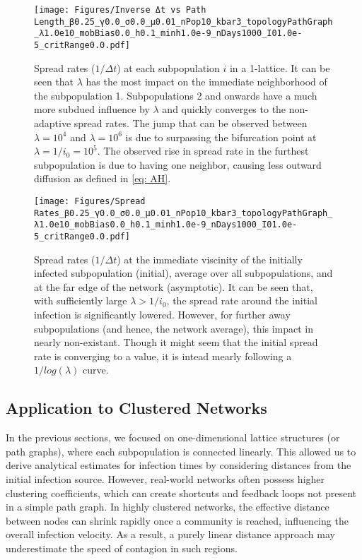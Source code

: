 \begin{figure}
    \centering
    \texttt{[image: Figures/Inverse Δt vs Path Length\_β0.25\_γ0.0\_σ0.0\_μ0.01\_nPop10\_kbar3\_topologyPathGraph\_λ1.0e10\_mobBias0.0\_h0.1\_minh1.0e-9\_nDays1000\_I01.0e-5\_critRange0.0.pdf]}
    \caption{\small Spread rates ($1/\Delta t$) at each subpopulation $i$ in a 1-lattice. It can be seen that $\lambda$ has the most impact on the immediate neighborhood of the subpopulation 1. Subpopulations 2 and onwards have a much more subdued influence by $\lambda$ and quickly converges to the non-adaptive spread rates. The jump that can be observed between $\lambda=10^4$ and $\lambda=10^6$ is due to surpassing the bifurcation point at $\lambda=1/i_0=10^5$. The observed rise in spread rate in the furthest subpopulation is due to having one neighbor, causing less outward diffusion as defined in \ref{eq: AH}.}
    \label{fig: inverse Δt vs path length var lambda}
\end{figure}

\begin{figure}
    \centering
    \texttt{[image: Figures/Spread Rates\_β0.25\_γ0.0\_σ0.0\_μ0.01\_nPop10\_kbar3\_topologyPathGraph\_λ1.0e10\_mobBias0.0\_h0.1\_minh1.0e-9\_nDays1000\_I01.0e-5\_critRange0.0.pdf]}
    \caption{\small Spread rates ($1/{\Delta t}$) at the immediate viscinity of the initially infected subpopulation (initial), average over all subpopulations, and at the far edge of the network (asymptotic). It can be seen that, with sufficiently large $\lambda >1/i_0$, the spread rate around the initial infection is significantly lowered. However, for further away subpopulations (and hence, the network average), this impact in nearly non-existant. Though it might seem that the initial spread rate is converging to a value, it is intead mearly following a $1/log(\lambda)$ curve.}
    \label{fig: Spread rates vs λ}
\end{figure}


\subsection{Application to Clustered Networks}
In the previous sections, we focused on one-dimensional lattice structures (or path graphs), where each subpopulation is connected linearly. This allowed us to derive analytical estimates for infection times by considering distances from the initial infection source. However, real-world networks often possess higher clustering coefficients, which can create shortcuts and feedback loops not present in a simple path graph. In highly clustered networks, the effective distance between nodes can shrink rapidly once a community is reached, influencing the overall infection velocity. As a result, a purely linear distance approach may underestimate the speed of contagion in such regions. \\

